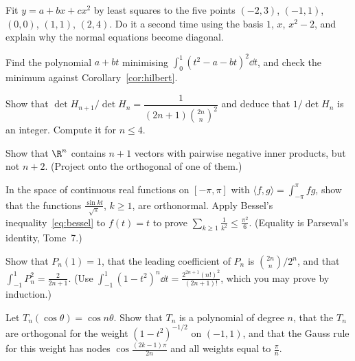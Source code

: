 \begin{exercise}[$\star\star$]\label{ex:parabola}
Fit $y=a+bx+cx^2$ by least squares to the five points $(-2,3)$, $(-1,1)$, $(0,0)$, $(1,1)$, $(2,4)$. Do it a second time
using the basis $1$, $x$, $x^2-2$, and explain why the normal equations become diagonal.
\end{exercise}

\begin{exercise}[$\star$]\label{ex:distpoly}
Find the polynomial $a+bt$ minimising $\int_0^1(t^2-a-bt)^2\dd t$, and check the minimum against
Corollary~\ref{cor:hilbert}.
\end{exercise}

\begin{exercise}[$\star$]\label{ex:hilbertint}
Show that $\det H_{n+1}/\det H_n=\dfrac1{(2n+1)\binom{2n}n^2}$ and deduce that $1/\det H_n$ is an integer. Compute it for
$n\le4$.
\end{exercise}

\begin{exercise}[$\star\star$]\label{ex:obtuse}
Show that $\R^n$ contains $n+1$ vectors with pairwise negative inner products, but not $n+2$. (Project onto the
orthogonal of one of them.)
\end{exercise}

\begin{exercise}[$\star\star$]\label{ex:basel}
In the space of continuous real functions on $[-\pi,\pi]$ with $\langle f,g\rangle=\int_{-\pi}^\pi fg$, show that the
functions $\frac{\sin kt}{\sqrt\pi}$, $k\ge1$, are orthonormal. Apply Bessel's inequality~\eqref{eq:bessel} to $f(t)=t$ to
prove $\sum_{k\ge1}\frac1{k^2}\le\frac{\pi^2}6$. (Equality is Parseval's identity, Tome~7.)
\end{exercise}

\begin{exercise}[$\star\star$]\label{ex:legendrenorm}
Show that $P_n(1)=1$, that the leading coefficient of $P_n$ is $\binom{2n}n/2^n$, and that $\int_{-1}^1P_n^2=\frac2{2n+1}$.
(Use $\int_{-1}^1(1-t^2)^n\dd t=\frac{2^{2n+1}(n!)^2}{(2n+1)!}$, which you may prove by induction.)
\end{exercise}

\begin{exercise}[$\star\star$]\label{ex:chebyshev}
Let $T_n(\cos\theta)=\cos n\theta$. Show that $T_n$ is a polynomial of degree $n$, that the $T_n$ are orthogonal for the
weight $(1-t^2)^{-1/2}$ on $(-1,1)$, and that the Gauss rule for this weight has nodes $\cos\frac{(2k-1)\pi}{2n}$ and all
weights equal to $\frac\pi n$.
\end{exercise}


